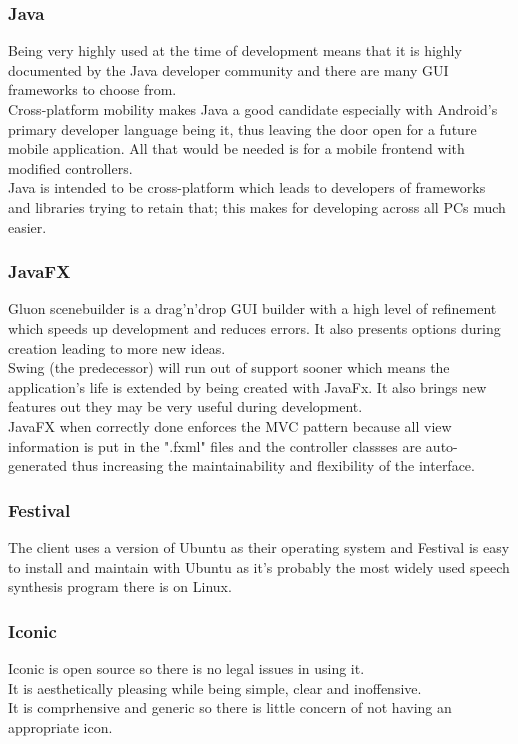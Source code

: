 \documentclass[conference]{IEEEtran}
\begin{document}
		\subsubsection{Java}
			Being very highly used at the time of development means that it is highly documented by the Java developer community and there are many GUI frameworks to choose from.\\
			Cross-platform mobility makes Java a good candidate especially with Android's primary developer language being it, thus leaving the door open for a future mobile application. All that would be needed is for a mobile frontend with modified controllers.\\
			Java is intended to be cross-platform which leads to developers of frameworks and libraries trying to retain that; this makes for developing across all PCs much easier.
		\subsubsection{JavaFX}
			Gluon scenebuilder is a drag'n'drop GUI builder with a high level of refinement which speeds up development and reduces errors. It also presents options during creation leading to more new ideas.\\
			Swing (the predecessor) will run out of support sooner which means the application's life is extended by being created with JavaFx. It also brings new features out they may be very useful during development.\\
			JavaFX when correctly done enforces the MVC pattern because all view information is put in the ".fxml" files and the controller classses are auto-generated thus increasing the maintainability and flexibility of the interface.
		\subsubsection{Festival}
			The client uses a version of Ubuntu as their operating system and Festival is easy to install and maintain with Ubuntu as it's probably the most widely used speech synthesis program there is on Linux.\\
		\subsubsection{Iconic}
			Iconic is open source so there is no legal issues in using it.\\
			It is aesthetically pleasing while being simple, clear and inoffensive.\\
			It is comprhensive and generic so there is little concern of not having an appropriate icon.\\
\end{document}
